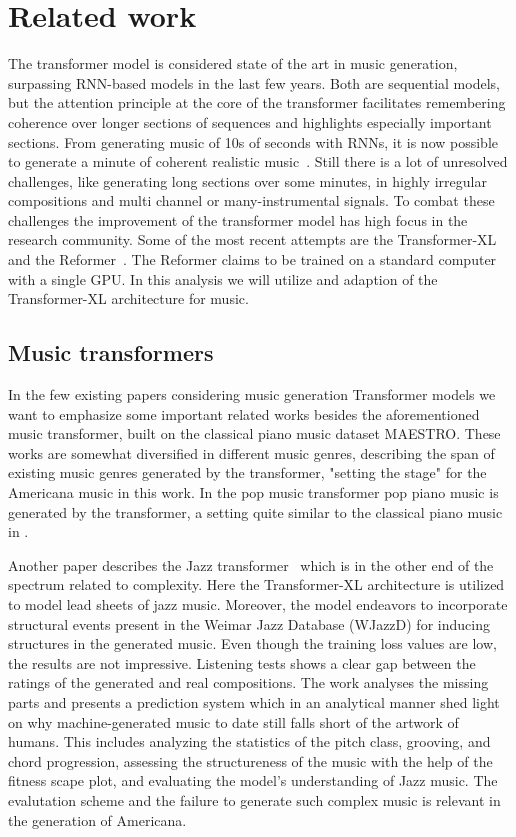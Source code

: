 \documentclass{IEEEtran}
\begin{document}
\section{Related work}

The transformer model is considered state of the art
in music generation, surpassing RNN-based models in the last few years. Both
are sequential models, but the attention principle at the core of the
transformer facilitates remembering coherence over longer sections of
sequences and highlights especially important sections. From generating music
of 10s of seconds with RNNs, it is now possible to generate a minute of
coherent realistic music~\cite{huang2018music}. Still there is a lot of
unresolved challenges, like generating long sections over some minutes, in
highly irregular compositions and multi channel or many-instrumental signals.
To combat these challenges the improvement of the transformer model has high
focus in the research community. Some of the most recent attempts are the
Transformer-XL~\cite{dai2019transformerxl} and the
Reformer~\cite{kitaev2020reformer}.
The Reformer claims to be trained on a standard computer with a single GPU.
In this analysis we will utilize and adaption of the Transformer-XL
architecture for music.

\subsection{Music transformers}

In the few existing papers considering music
generation Transformer models we want to emphasize some important related
works besides the aforementioned music transformer, built on the classical
piano music dataset MAESTRO. These works are somewhat diversified in
different music genres, describing the span of existing music genres
generated by the transformer, "setting the stage" for the Americana music in
this work. In the pop music transformer \cite{huang2020pop} pop piano music
is generated by the transformer, a setting quite similar to the classical
piano music in \cite{huang2018music}.

Another paper describes the Jazz transformer~\cite{wu2020jazz} which is in
the other end of the spectrum related to complexity. Here the
Transformer-XL architecture is utilized to model lead sheets of jazz music.
Moreover, the model endeavors to incorporate structural events present in the
Weimar Jazz Database (WJazzD) for inducing structures in the generated music.
Even though the training loss values are low, the results are not impressive.
Listening tests shows a clear gap between the ratings of the generated and
real compositions. The work analyses the missing parts and presents a
prediction system which in an analytical manner shed light on why
machine-generated music to date still falls short of the artwork of humans.
This includes analyzing the statistics of the pitch class, grooving, and
chord progression, assessing the structureness of the music with the help of
the fitness scape plot, and evaluating the model’s understanding of Jazz
music. The evalutation scheme and the failure to generate such complex music
is relevant in the generation of Americana.
\end{document}

